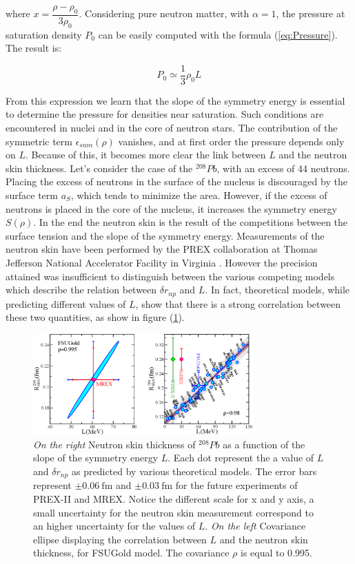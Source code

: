 where $x = \dfrac{\rho - \rho_{0}}{3 \rho_{0}}$. Considering pure neutron matter, with $\alpha = 1$, the pressure at saturation density $P_{0}$ can be easily computed with the formula (\ref{eq:Pressure}). The result is:

\begin{equation} \label{eq:PressureL}
P_{0} \simeq \dfrac{1}{3}\rho_{0} L
\end{equation}

From this expression we learn that the slope of the symmetry energy is essential to determine the pressure for densities near saturation. Such conditions are encountered in nuclei and in the core of neutron stars. The contribution of the symmetric term $\epsilon_{snm}(\rho)$ vanishes, and at first order the pressure depends only on $L$. Because of this, it becomes more clear the link between $L$ and the neutron skin thickness. Let's consider the case of the $^{208}Pb$, with an excess of 44 neutrons. Placing the excess of neutrons in the surface of the nucleus is discouraged by the surface term $a_{S}$, which tends to minimize the area. However, if the excess of neutrons is placed in the core of the nucleus, it increases the symmetry energy $S(\rho)$. In the end the neutron skin is the result of the competitions between the surface tension and the slope of the symmetry energy.
 Measurements of the neutron skin have been performed by the PREX collaboration at Thomas Jefferson National Accelerator Facility in Virginia \cite{Abrahamyan:2012gp}. However the precision attained was insufficient to distinguish between the various competing models which describe the relation between $\delta r_{np}$ and $L$. In fact, theoretical models, while predicting different values of $L$, show that there is a strong correlation between these two quantities, as show in figure (\ref{fig:LvsR}).

\begin{figure}[hbtp]
 \centering
 \includegraphics[width=0.75\textwidth]{Introduzione/LvsR.pdf}
 \caption{\textit{On the right} Neutron skin thickness of $^{208}Pb$ as a function of the slope of the symmetry energy $L$. Each dot represent the a value of $L$ and $\delta r_{np}$ as predicted by various theoretical models. The error bars represent $\pm \SI{0.06}{\femto \meter}$ and $\pm \SI{0.03}{\femto \meter}$ for the future experiments of PREX-II and MREX. Notice the different scale for x and y axis, a small uncertainty for the neutron skin measurement correspond to an higher uncertainty for the values of $L$. \textit{On the left} Covariance ellipse displaying the correlation between $L$ and the neutron skin thickness, for FSUGold model. The covariance $\rho$ is equal to 0.995.}
\label{fig:LvsR}
\end{figure}
 
